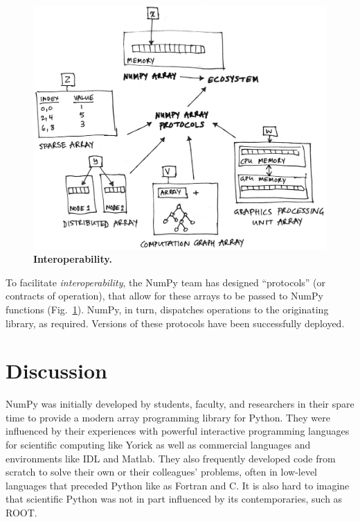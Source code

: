 \begin{figure}
  \centering
  \includegraphics[width=.45\textwidth]{static/sketches/duck-arrays}
  \caption{\textbf{Interoperability.} }\label{fig:duck-arrays}
\end{figure}


To facilitate \emph{interoperability}, the NumPy team has designed
``protocols'' (or contracts of operation), that allow for these arrays to be
passed to NumPy functions (Fig.~\ref{fig:duck-arrays}).
NumPy, in turn, dispatches operations to the originating library, as required.
Versions of these protocols have been successfully deployed.


\section*{Discussion}


NumPy was initially developed by students, faculty, and researchers in their
spare time to provide a modern array programming library for Python.  They were
influenced by their experiences with powerful interactive programming languages
for scientific computing like Yorick \cite{munro1995using} as well as
commercial languages and environments like IDL and Matlab.  They also
frequently developed code from scratch to solve their own or their colleagues'
problems, often in low-level languages that preceded Python like as Fortran
\cite{dongarra2008netlib} and C.  It is also hard to imagine that scientific
Python was not in part influenced by its contemporaries, such as ROOT.


